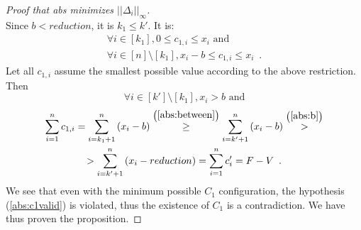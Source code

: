 \begin{proof}[Proof that abs minimizes $||\Delta_i||_{\infty}$]
\begin{equation*}
  \end{equation*}
  Since $b < reduction$, it is $k_1 \leq k'$. It is:
  \begin{equation*}
  \begin{gathered}
    \forall i \in \left[k_1\right], 0 \leq c_{1, i} \leq x_i \mbox{ and} \\
    \forall i \in \left[n\right] \setminus \left[k_1\right], x_i - b \leq c_{1, i} \leq x_i \enspace.
  \end{gathered}
  \end{equation*}
  Let all $c_{1, i}$ assume the smallest possible value according to the above restriction. Then
  \begin{equation}
  \label{abs:between}
    \forall i \in \left[k'\right] \setminus \left[k_1\right], x_i > b \mbox{ and}
  \end{equation}
  \begin{equation*}
  \begin{gathered}
    \sum\limits_{i=1}^nc_{1, i} = \sum\limits_{i=k_1+1}^n\left(x_i - b\right) \overset{\left(\ref{abs:between}\right)}{\geq}
    \sum\limits_{i=k'+1}^n\left(x_i - b\right) \overset{\left(\ref{abs:b}\right)}{>} \\
    > \sum\limits_{i=k'+1}^n\left(x_i - reduction\right) = \sum\limits_{i=1}^nc'_i = F - V \enspace.
  \end{gathered}
  \end{equation*}
  We see that even with the minimum possible $C_1$ configuration, the hypothesis (\ref{abs:c1valid}) is violated, thus the
  existence of $C_1$ is a contradiction. We have thus proven the proposition.
\end{proof}
